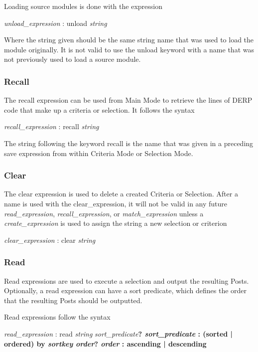 Loading source modules is done with the expression
\begin{center}
    \emph{unload_expression} : unload \emph{string}
\end{center}

Where the string given should be the same string name that was used to load the module originally. 
It is not valid to use the unload keyword with a name that was not previously used to load a source module.

\subsubsection{Recall}
The recall expression can be used from Main Mode to retrieve the lines of DERP code that make up a 
criteria or selection. It follows the syntax
\begin{center}
    \emph{recall_expression}  :  recall \emph{string}
\end{center}

The string following the keyword recall is the name that was given in a preceding save expression from 
within Criteria Mode or Selection Mode.

\subsubsection{Clear}
The clear expression is used to delete a created Criteria or Selection. After a name is used with the 
clear_expression, it will not be valid in any future \emph{read_expression}, \emph{recall_expression}, or \emph{match_expression} 
unless a \emph{create_expression} is used to assign the string a new selection or criterion
\begin{center}
    \emph{clear_expression}  :  clear \emph{string}
\end{center}

\subsubsection{Read}
Read expressions are used to execute a selection and output the resulting Posts. Optionally, a read 
expression can have a sort predicate, which defines the order that the resulting Posts should be outputted.

Read expressions follow the syntax
\begin{center}
    \emph{read_expression}  :  read \emph{string} \emph{sort_predicate}\bf{?}
    \emph{sort_predicate}  :  \bf{(}sorted \bf{|} ordered\bf{)} by \emph{sortkey order}\bf{?}
    \emph{order}  :  ascending \bf{|} descending
\end{center}

